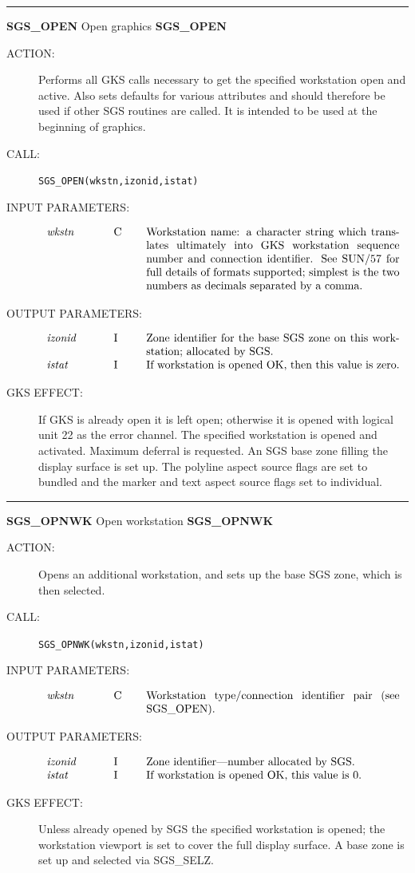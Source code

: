 \documentclass[11pt]{article}
\newcommand{\htmlref}[2]{#1}
\newcommand{\xref}[3]{#1}
\newcommand{\xlabel}[1]{}
\newcommand{\rthead}[2]{\rule{\textwidth}{0.3mm}
{\Large {\bf #1} \hfill #2 \hfill {\bf #1}}}
\newenvironment{params}%
{\[\begin{tabular}{p{0.14\textwidth}p{0.05\textwidth}p{0.66\textwidth}}}%
{\end{tabular}\]}
\newcommand{\rparams}[3]{{\em #1} &#2 &#3\\}
\newcommand{\rthead}[2]{\subsection{\label{#1}\xlabel{#1}#1 - #2}}
\newenvironment{params}{\begin{description}}{\end{description}}
\newcommand{\rparams}[3]{\item{{\em #1}} (#2) #3}
\begin{document}
\rthead{SGS\_OPEN}{Open graphics}
\begin{description}
\item [ACTION:]
Performs all GKS calls necessary to get the specified workstation open and
active.
Also sets defaults for various attributes and should therefore be used if
other SGS routines are called.
It is intended to be used at the beginning of graphics.
\item [CALL:]
{\tt SGS\_OPEN(wkstn,izonid,istat)}
\item [INPUT PARAMETERS:]
\begin{params}
\rparams{wkstn}{C}{Workstation name: a character string which translates
ultimately into GKS workstation sequence number and connection identifier. 
See \xref{SUN/57}{sun57}{}
for full details of formats supported; simplest is the two numbers
as decimals separated by a comma.}
\end{params}
\item [OUTPUT PARAMETERS:]
\begin{params}
\rparams{izonid}{I}{Zone identifier for the base SGS zone on this workstation;
allocated by SGS.}
\rparams{istat}{I}{If workstation is opened OK, then this value is zero.}
\end{params}
\item [GKS EFFECT:]
If GKS is already open it is left open; otherwise it is opened with logical
unit 22 as the error channel.
The specified workstation is opened and activated.
Maximum deferral is requested.
An SGS base zone filling the display surface is set up.
The polyline aspect source flags are set to bundled and the marker and text
aspect source flags set to individual.
\end{description}
\goodbreak

\rthead{SGS\_OPNWK}{Open workstation}
\begin{description}
\item [ACTION:]
Opens an additional workstation, and sets up the base SGS zone, which is then
selected.
\item [CALL:]
{\tt SGS\_OPNWK(wkstn,izonid,istat)}
\item [INPUT PARAMETERS:]
\begin{params}
\rparams{wkstn}{C}{Workstation type/connection identifier pair (see SGS\_OPEN).}
\end{params}
\item [OUTPUT PARAMETERS:]
\begin{params}
\rparams{izonid}{I}{Zone identifier---number allocated by SGS.}
\rparams{istat}{I}{If workstation is opened OK, this value is 0.}
\end{params}
\item [GKS EFFECT:]
Unless already opened by SGS the specified workstation is opened; the
workstation viewport is set to cover the full display surface.
A base zone is set up and selected via \htmlref{SGS\_SELZ}{SGS_SELZ}.
\end{description}
\goodbreak
\end{document}
